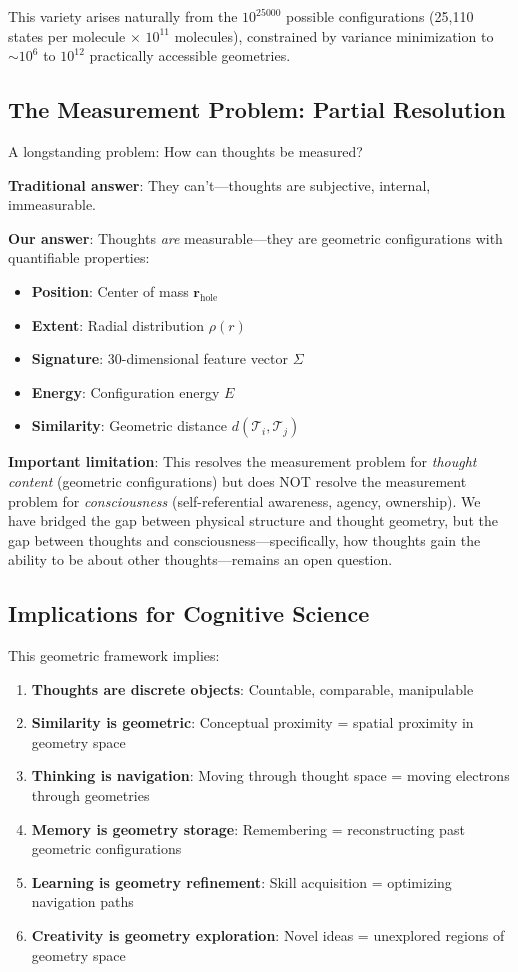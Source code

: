 \documentclass[11pt]{article}
\theoremstyle{remark}
\begin{document}
This variety arises naturally from the $10^{25000}$ possible  configurations (25,110 states per molecule × $10^{11}$ molecules), constrained by variance minimization to $\sim 10^6$ to $10^{12}$ practically accessible geometries.

\subsection{The Measurement Problem: Partial Resolution}

A longstanding problem: How can thoughts be measured?

\textbf{Traditional answer}: They can't—thoughts are subjective, internal, immeasurable.

\textbf{Our answer}: Thoughts \textit{are} measurable—they are geometric configurations with quantifiable properties:
\begin{itemize}
\item \textbf{Position}: Center of mass $\mathbf{r}_{\text{hole}}$
\item \textbf{Extent}: Radial distribution $\rho(r)$
\item \textbf{Signature}: 30-dimensional feature vector $\Sigma$
\item \textbf{Energy}: Configuration energy $E$
\item \textbf{Similarity}: Geometric distance $d(\mathcal{T}_i, \mathcal{T}_j)$
\end{itemize}

\textbf{Important limitation}: This resolves the measurement problem for \textit{thought content} (geometric configurations) but does NOT resolve the measurement problem for \textit{consciousness} (self-referential awareness, agency, ownership). We have bridged the gap between physical structure and thought geometry, but the gap between thoughts and consciousness—specifically, how thoughts gain the ability to be about other thoughts—remains an open question.

\subsection{Implications for Cognitive Science}

This geometric framework implies:

\begin{enumerate}
\item \textbf{Thoughts are discrete objects}: Countable, comparable, manipulable
\item \textbf{Similarity is geometric}: Conceptual proximity = spatial proximity in geometry space
\item \textbf{Thinking is navigation}: Moving through thought space = moving electrons through geometries
\item \textbf{Memory is geometry storage}: Remembering = reconstructing past geometric configurations
\item \textbf{Learning is geometry refinement}: Skill acquisition = optimizing navigation paths
\item \textbf{Creativity is geometry exploration}: Novel ideas = unexplored regions of geometry space
\end{enumerate}
\end{document}
